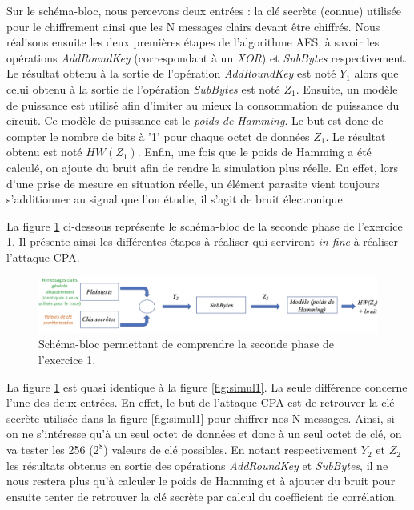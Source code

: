 \documentclass[10pt, oneside, a4paper]{article}
\begin{document}
\vspace{-0.4 cm}Sur le schéma-bloc, nous percevons deux entrées : la clé secrète (connue) utilisée pour le chiffrement ainsi que les N messages clairs devant être chiffrés. Nous réalisons ensuite les deux premières étapes de l'algorithme AES, à savoir les opérations \textit{AddRoundKey} (correspondant à un \textit{XOR}) et \textit{SubBytes} respectivement. Le résultat obtenu à la sortie de l'opération \textit{AddRoundKey} est noté \textit{$Y_1$} alors que celui obtenu à la sortie de l'opération \textit{SubBytes} est noté \textit{$Z_1$}. Ensuite, un modèle de puissance est utilisé afin d'imiter au mieux la consommation de puissance du circuit. Ce modèle de puissance est le \textit{poids de Hamming}. Le but est donc de compter le nombre de bits à '1' pour chaque octet de données \textit{$Z_1$}. Le résultat obtenu est noté \textit{$HW(Z_1)$}. Enfin, une fois que le poids de Hamming a été calculé, on ajoute du bruit afin de rendre la simulation plus réelle. En effet, lors d'une prise de mesure en situation réelle, un élément parasite vient toujours s'additionner au signal que l'on étudie, il s'agit de bruit électronique.

La figure \ref{fig:simul2} ci-dessous représente le schéma-bloc de la seconde phase de l'exercice 1. Il présente ainsi les différentes étapes à réaliser qui serviront \textit{in fine} à réaliser l'attaque CPA.
\begin{figure}[htbp]
    \centering
    \includegraphics[scale=0.45]{image/simul2}
    \caption{Schéma-bloc permettant de comprendre la seconde phase de l'exercice 1.}
    \label{fig:simul2} 
\end{figure}

\vspace{-0.4 cm}La figure \ref{fig:simul2} est quasi identique à la figure \ref{fig:simul1}. La seule différence concerne l'une des deux entrées. En effet, le but de l'attaque CPA est de retrouver la clé secrète utilisée dans la figure \ref{fig:simul1} pour chiffrer nos N messages. Ainsi, si on ne s'intéresse qu'à un seul octet de données et donc à un seul octet de clé, on va tester les 256 ($2^8$) valeurs de clé possibles. En notant respectivement $Y_2$ et $Z_2$ les résultats obtenus en sortie des opérations \textit{AddRoundKey} et \textit{SubBytes}, il ne nous restera plus qu'à calculer le poids de Hamming et à ajouter du bruit pour ensuite tenter de retrouver la clé secrète par calcul du coefficient de corrélation.
\end{document}

